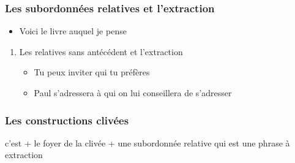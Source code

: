 \documentclass[UTF8]{report}
\begin{document}
\subsubsection{Les subordonnées relatives et l’extraction}
\begin{itemize}
    \item Voici le livre auquel je pense
\end{itemize}
\begin{enumerate}
    \item Les relatives sans antécédent et l’extraction
    \begin{itemize}
        \item Tu peux inviter qui tu préfères
        \item Paul s’adressera à qui on lui conseillera de s’adresser
    \end{itemize}
\end{enumerate}
\subsubsection{Les constructions clivées}
c’est + le foyer de la clivée + une subordonnée relative qui est une phrase à extraction
\end{document}
